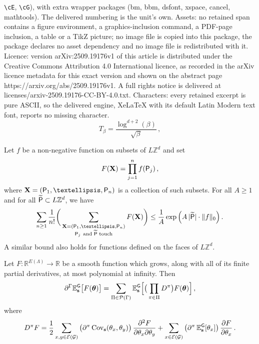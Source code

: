 \documentclass[10pt,a4paper]{amsart}
\newcommand{\Cov}{\operatorname{Cov}}
\def\Ga{{\Gamma}}
\def\La{{\Lambda}}
\newcommand{\bE}{\mathbb E}
\newcommand{\bR}{\mathbb R}
\newcommand{\bZ}{\mathbb Z}
\newcommand{\cE}{\mathcal{E}}
\newcommand{\cG}{\mathcal G}
\begin{document}
\texttt{\textbackslash cE}, \texttt{\textbackslash cG}), with extra wrapper packages (bm, bbm, dsfont, xspace, cancel, mathtools). The delivered numbering is the unit's own. Assets: no retained span contains a figure environment, a graphics-inclusion command, a PDF-page inclusion, a table or a TikZ picture; no image file is copied into this package, the package declares no asset dependency and no image file is redistributed with it. Licence: version arXiv:2509.19176v1 of this article is distributed under the Creative Commons Attribution 4.0 International licence, as recorded in the arXiv licence metadata for this exact version and shown on the abstract page https://arxiv.org/abs/2509.19176v1. A full rights notice is delivered at licenses/arxiv-2509.19176-CC-BY-4.0.txt. Characters: every retained excerpt is pure ASCII, so the delivered engine, XeLaTeX with its default Latin Modern text font, reports no missing character.
    \begin{equation}
        \label{eq:def_of_T_beta}
        T_\beta = \frac{\log^{d+2}(\beta)}{\sqrt{\beta}} \, ,
    \end{equation}

    \begin{claim}
    \label{claim:bound_on_function_on_collection_of_subsets}
        Let $f$ be a non-negative function on subsets of $L\bZ^d$ and set
        \[
        F(\mathbf{X}) = \prod_{j=1}^n f({\sf P}_j) \, ,
        \]
        where $\mathbf{X} = ({\sf P}_1,\ldots,{\sf P}_n)$ is a collection of such  
        subsets. For all $A\ge 1$ and for all $\widetilde{{\sf P}} \subset L\bZ^d$, we have
        \[
        \sum_{n\ge 1} \frac{1}{n!} \bigg(\sum_{\substack{\mathbf{X} = ({\sf P}_1,\ldots,{\sf P}_n) \\ {\sf P}_j \  \text{and $\widetilde{{\sf P}}$ touch}}} F(\mathbf{X}) \bigg) \le \frac{1}{A} \exp\Big(A \, |\widetilde{{\sf P}}| \cdot \|f\|_0\Big) \, .
        \]
        A similar bound also holds for functions defined on the faces of $L\bZ^d$. 
    \end{claim}

    \begin{lemma} \label{lemma:gaussian_integration_by_parts}
        Let $F:\bR^{E(\La)} \to \bR$ be a smooth function which grows, along with all of its finite partial derivatives, at most polynomial at infinity. Then
        \[
        \partial^\Ga \bE_{\mathbf{s}}^{\sf G}\big[ F(\boldsymbol{\theta}) \big] = \sum_{\Pi\in \mathcal{P}(\Ga)} \bE_{\mathbf{s}}^{\sf G}\Big[ \big(\prod_{\pi\in \Pi} D^\pi\big) F(\boldsymbol{\theta}) \Big] \, ,
        \]
        where
        \begin{equation} \label{eq:def_of_D_pi}
         D^\pi F = \frac{1}{2} \sum_{x,y\in \cE(\cG)} \big(\partial^\pi \Cov_{\mathbf{s}} (\theta_x,\theta_y) \big) \, \frac{\partial^2 F}{ \partial \theta_x \partial \theta_y} + \sum_{x\in \cE(\cG)} \big(\partial^\pi \, \bE_{\mathbf{s}}^{\sf G}[\theta_x]\big) \, \frac{\partial F}{\partial \theta_x} \, .
        \end{equation}
    \end{lemma}
\end{document}
